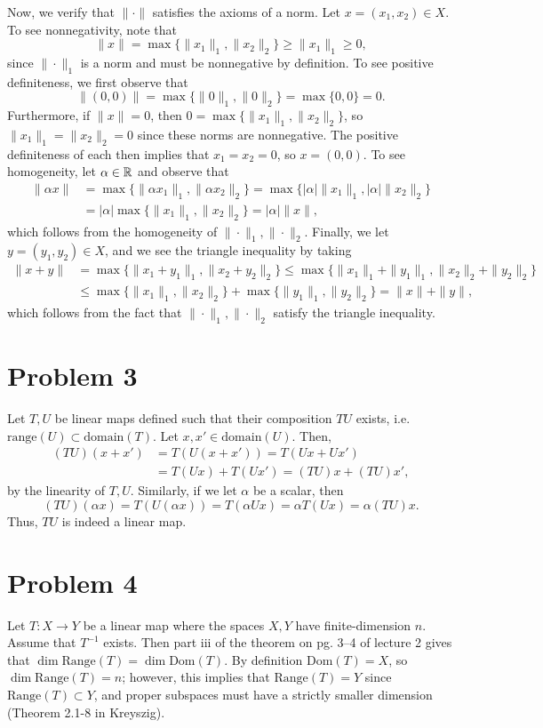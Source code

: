 \documentclass{article}
\begin{document}
Now, we verify that $\|\cdot\|$ satisfies the axioms of a norm. Let $x=(x_1,x_2)\in X$. To see nonnegativity, note that
\[
\|x\|=\max\{\|x_1\|_1,\|x_2\|_2\}\geq\|x_1\|_1\geq0,
\] 
since $\|\cdot\|_1$ is a norm and must be nonnegative by definition. To see positive definiteness, we first observe that 
\[
\|(0,0)\|=\max\{\|0\|_1,\|0\|_2\}=\max\{0,0\}=0.
\]
Furthermore, if $\|x\|=0$, then $0=\max\{\|x_1\|_1,\|x_2\|_2\}$, so $\|x_1\|_1=\|x_2\|_2=0$ since these norms are nonnegative. The positive definiteness of each then implies that $x_1=x_2=0$, so $x=(0,0)$. To see homogeneity, let $\alpha\in\mathbb{R}$ and observe that 
\begin{align*}
\|\alpha x\|&=\max\{\|\alpha x_1\|_1,\|\alpha x_2\|_2\}=\max\{|\alpha|\| x_1\|_1,|\alpha|\|x_2\|_2\}\\&=
|\alpha|\max\{\| x_1\|_1,\|x_2\|_2\}=|\alpha|\|x\|,
\end{align*}
which follows from the homogeneity of $\|\cdot\|_1,\|\cdot\|_2$. Finally, we let $y=(y_1,y_2)\in X$, and we see the triangle inequality by taking
\begin{align*}
\|x+y\|&=\max\{\|x_1+y_1\|_1,\|x_2+y_2\|_2\}\leq\max\{\|x_1\|_1+\|y_1\|_1,\|x_2\|_2+\|y_2\|_2\}\\&\leq
\max\{\|x_1\|_1,\|x_2\|_2\}+\max\{\|y_1\|_1,\|y_2\|_2\}=\|x\|+\|y\|,
\end{align*}
which follows from the fact that $\|\cdot\|_1,\|\cdot\|_2$ satisfy the triangle inequality. 

\section{Problem 3}
Let $T,U$ be linear maps defined such that their composition $TU$ exists, i.e. $\text{range}(U)\subset\text{domain}(T)$. Let $x,x'\in\text{domain}(U)$. Then, 
\begin{align*}
(TU)(x+x')&=T(U(x+x'))=T(Ux+Ux')\\&=
T(Ux)+T(Ux')=(TU)x+(TU)x',
\end{align*}
by the linearity of $T,U$. Similarly, if we let $\alpha$ be a scalar, then
\[
(TU)(\alpha x)=T(U(\alpha x))=T(\alpha Ux)=\alpha T(Ux)=\alpha (TU)x.
\]
Thus, $TU$ is indeed a linear map.

\section{Problem 4}
Let $T:X\to Y$ be a linear map where the spaces $X,Y$ have finite-dimension $n$. Assume that $T^{-1}$ exists. Then part iii of the theorem on pg. 3--4 of lecture 2 gives that $\dim\text{Range}(T)=\dim\text{Dom}(T)$. By definition $\text{Dom}(T)=X$, so $\dim\text{Range}(T)=n$; however, this implies that $\text{Range}(T)=Y$ since $\text{Range}(T)\subset Y$, and proper subspaces must have a strictly smaller dimension (Theorem 2.1-8 in Kreyszig).
\end{document}
